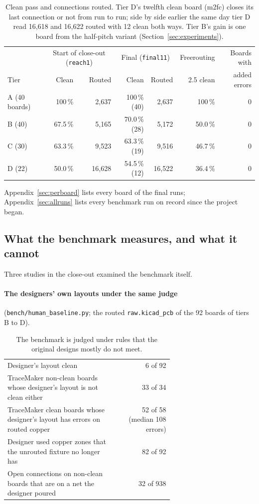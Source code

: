 \documentclass[10pt,a4paper]{article}
\newcommand{\code}[1]{\texttt{#1}}
\begin{document}
\begin{table}[H]
\centering\small
\begin{tabular}{@{}lrrrrrr@{}}
\toprule
 & \multicolumn{2}{c}{Start of close-out (\code{reach1})} & \multicolumn{2}{c}{Final (\code{final11})} & Freerouting & Boards with \\
Tier & Clean & Routed & Clean & Routed & 2.5 clean & added errors \\
\midrule
A (40 boards) & 100\,\% & 2,637 & 100\,\% (40) & 2,637 & 100\,\% & 0 \\
B (40) & 67.5\,\% & 5,165 & 70.0\,\% (28) & 5,172 & 50.0\,\% & 0 \\
C (30) & 63.3\,\% & 9,523 & 63.3\,\% (19) & 9,516 & 46.7\,\% & 0 \\
D (22) & 50.0\,\% & 16,628 & 54.5\,\% (12) & 16,522 & 36.4\,\% & 0 \\
\bottomrule
\end{tabular}
\caption{Clean pass and connections routed. Tier D's twelfth clean board (m2fc) closes its last connection or not
from run to run; side by side earlier the same day tier D read 16,618 and 16,622 routed with 12 clean both ways.
Tier B's gain is one board from the half-pitch variant (Section~\ref{sec:experiments}).}
\label{tab:final}
\end{table}

Appendix~\ref{sec:perboard} lists every board of the final runs; Appendix~\ref{sec:allruns} lists every benchmark
run on record since the project began.

\subsection{What the benchmark measures, and what it cannot}\label{sec:humanbaseline}

Three studies in the close-out examined the benchmark itself.

\paragraph{The designers' own layouts under the same judge} (\code{bench/human\_baseline.py}; the routed
\code{raw.kicad\_pcb} of the 92 boards of tiers B to D).

\begin{table}[H]
\centering\small
\begin{tabular}{@{}p{0.66\linewidth}r@{}}
\toprule
Designer's layout clean & 6 of 92 \\
TraceMaker non-clean boards whose designer's layout is not clean either & 33 of 34 \\
TraceMaker clean boards whose designer's layout has errors on routed copper & 52 of 58 (median 108 errors) \\
Designer used copper zones that the unrouted fixture no longer has & 82 of 92 \\
Open connections on non-clean boards that are on a net the designer poured & 32 of 938 \\
\bottomrule
\end{tabular}
\caption{The benchmark is judged under rules that the original designs mostly do not meet.}
\end{table}
\end{document}
